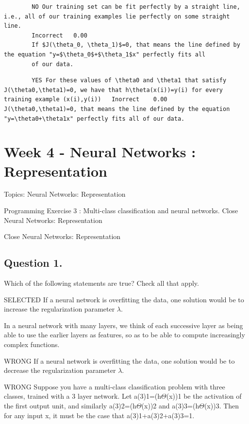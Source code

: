 		\begin{verbatim}
		NO Our training set can be fit perfectly by a straight line, i.e., all of our training examples lie perfectly on some straight line.	
		Incorrect	0.00	
		If $J(\theta_0, \theta_1)$=0, that means the line defined by the equation "y=$\theta_0$+$\theta_1$x" perfectly fits all
		of our data.
		\end{verbatim}
		
		\begin{verbatim}
		YES For these values of \theta0 and \theta1 that satisfy J(\theta0,\theta1)=0, we have that h\theta(x(i))=y(i) for every training example (x(i),y(i))	Inorrect	0.00	J(\theta0,\theta1)=0, that means the line defined by the equation "y=\theta0+\theta1x" perfectly fits all of our data.
		\end{verbatim}
		\newpage
	\section{Week 4 - Neural Networks : Representation}
	
	
	Topics: Neural Networks: Representation
	
	Programming Exercise 3 : Multi-class classification and neural networks.
	Close
	Neural Networks: Representation
	
Close
Neural Networks: Representation

\subsection*{Question 1. }
Which of the following statements are true? Check all that apply.

SELECTED If a neural network is overfitting the data, one solution would be to increase the regularization parameter $\lambda$.

In a neural network with many layers, we think of each successive layer as being able to use the earlier layers as features, so as to be able to compute increasingly complex functions.

WRONG If a neural network is overfitting the data, one solution would be to decrease the regularization parameter $\lambda$.

WRONG Suppose you have a multi-class classification problem with three classes, trained with a 3 layer network. Let a(3)1=(h$\Theta$(x))1 be the activation of the first output unit, and similarly a(3)2=(h$\Theta$(x))2 and a(3)3=(h$\Theta$(x))3. Then for any input x, it must be the case that a(3)1+a(3)2+a(3)3=1.


